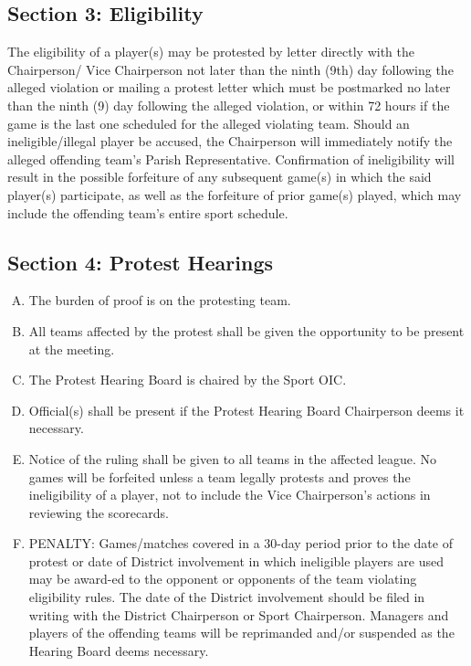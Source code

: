 \documentclass[letteraper,10pt,oneside,draft]{memoir}
\begin{document}
\subsection{Section 3: Eligibility}
The eligibility of a player(s) may be protested by letter directly with the Chairperson/ Vice Chairperson not later than the ninth (9th) day following the alleged violation or mailing a protest letter which must be postmarked no later than the ninth (9) day following the alleged violation, or within 72 hours if the game is the last one scheduled for the alleged violating team.  Should an ineligible/illegal player be accused, the Chairperson will immediately notify the alleged offending team’s Parish Representative. Confirmation of ineligibility will result in the possible forfeiture of any subsequent game(s) in which the said player(s) participate, as well as the forfeiture of prior game(s) played, which may include the offending team’s entire sport schedule.

\subsection{Section 4: Protest Hearings}
\begin{enumerate}[A.]
    \item The burden of proof is on the protesting team.
    \item All teams affected by the protest shall be given the opportunity to be present at the meeting.
    \item The Protest Hearing Board is chaired by the Sport OIC.
    \item Official(s) shall be present if the Protest Hearing Board Chairperson deems it necessary.
    \item Notice of the ruling shall be given to all teams in the affected league.  No games will be forfeited unless a team legally protests and proves the ineligibility of a player, not to include the Vice Chairperson’s actions in reviewing the scorecards.
    \item PENALTY: Games/matches covered in a 30-day period prior to the date of protest or date of District involvement in which ineligible players are used may be award-ed to the opponent or opponents of the team violating eligibility rules. The date of the District involvement should be filed in writing with the District Chairperson or Sport Chairperson. Managers and players of the offending teams will be reprimanded and/or suspended as the Hearing Board deems necessary.
\end{enumerate}
\end{document}
